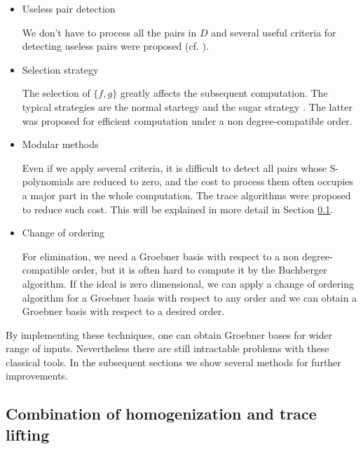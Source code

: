 \documentclass[runningheads]{cl2emult}
\begin{document}
\begin{itemize}
\item Useless pair detection

We don't have to process all the pairs in $D$ and several useful
criteria for detecting useless pairs were proposed (cf. \cite{noro:BW}).

\item Selection strategy

The selection of $\{f,g\}$ greatly affects the subsequent computation.
The typical strategies are the normal startegy \cite{noro:BUCH}
and the sugar strategy \cite{noro:SUGAR}.
The latter was proposed for efficient computation under a non 
degree-compatible order.

\item Modular methods

Even if we apply several criteria, it is difficult to detect all pairs
whose S-polynomials are reduced to zero, and the cost to process them
often occupies a major part in the whole computation. The trace
algorithms \cite{noro:TRAV} were proposed to reduce such cost. This
will be explained in more detail in Section \ref{sec:gbhomo}.

\item Change of ordering

For elimination, we need a Groebner basis with respect to a non
degree-compatible order, but it is often hard to compute it by the
Buchberger algorithm. If the ideal is zero dimensional, we can apply a
change of ordering algorithm \cite{noro:FGLM} for a Groebner basis
with respect to any order and we can obtain a Groebner basis with
respect to a desired order.

\end{itemize}
By implementing these techniques, one can obtain Groebner bases for
wider range of inputs. Nevertheless there are still intractable
problems with these classical tools. In the subsequent sections
we show several methods for further improvements.

\subsection{Combination of homogenization and trace lifting}
\label{sec:gbhomo}
\end{document}

